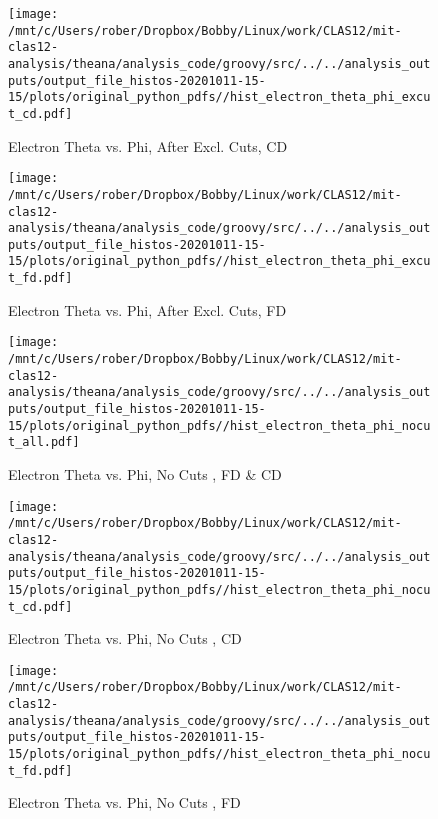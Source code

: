 \documentclass{article}
\begin{document}
\begin{landscape}
\begin{figure}[h]
        \texttt{[image: /mnt/c/Users/rober/Dropbox/Bobby/Linux/work/CLAS12/mit-clas12-analysis/theana/analysis\_code/groovy/src/../../analysis\_outputs/output\_file\_histos-20201011-15-15/plots/original\_python\_pdfs//hist\_electron\_theta\_phi\_excut\_cd.pdf]}
        \captionsetup{textformat=empty,labelformat=blank}
        \caption{Electron Theta vs. Phi, After Excl. Cuts, CD}
    \end{figure}
    \clearpage
    
    \begin{figure}[h]
        \centering

        \texttt{[image: /mnt/c/Users/rober/Dropbox/Bobby/Linux/work/CLAS12/mit-clas12-analysis/theana/analysis\_code/groovy/src/../../analysis\_outputs/output\_file\_histos-20201011-15-15/plots/original\_python\_pdfs//hist\_electron\_theta\_phi\_excut\_fd.pdf]}
        \captionsetup{textformat=empty,labelformat=blank}
        \caption{Electron Theta vs. Phi, After Excl. Cuts, FD}
    \end{figure}
    \clearpage
    
    \begin{figure}[h]
        \centering

        \texttt{[image: /mnt/c/Users/rober/Dropbox/Bobby/Linux/work/CLAS12/mit-clas12-analysis/theana/analysis\_code/groovy/src/../../analysis\_outputs/output\_file\_histos-20201011-15-15/plots/original\_python\_pdfs//hist\_electron\_theta\_phi\_nocut\_all.pdf]}
        \captionsetup{textformat=empty,labelformat=blank}
        \caption{Electron Theta vs. Phi, No Cuts , FD \& CD}
    \end{figure}
    \clearpage
    
    \begin{figure}[h]
        \centering

        \texttt{[image: /mnt/c/Users/rober/Dropbox/Bobby/Linux/work/CLAS12/mit-clas12-analysis/theana/analysis\_code/groovy/src/../../analysis\_outputs/output\_file\_histos-20201011-15-15/plots/original\_python\_pdfs//hist\_electron\_theta\_phi\_nocut\_cd.pdf]}
        \captionsetup{textformat=empty,labelformat=blank}
        \caption{Electron Theta vs. Phi, No Cuts , CD}
    \end{figure}
    \clearpage
    
    \begin{figure}[h]
        \centering

        \texttt{[image: /mnt/c/Users/rober/Dropbox/Bobby/Linux/work/CLAS12/mit-clas12-analysis/theana/analysis\_code/groovy/src/../../analysis\_outputs/output\_file\_histos-20201011-15-15/plots/original\_python\_pdfs//hist\_electron\_theta\_phi\_nocut\_fd.pdf]}
        \captionsetup{textformat=empty,labelformat=blank}
        \caption{Electron Theta vs. Phi, No Cuts , FD}
    \end{figure}
    \clearpage
    

\end{landscape}
\end{document}
